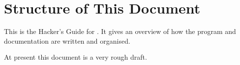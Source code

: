\section{Structure of This Document}

This is the Hacker's Guide for .
It gives an overview of how the program and documentation
are written and organised.

At present this document is a very rough draft.

